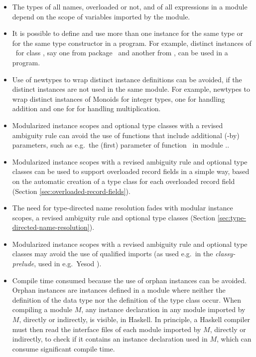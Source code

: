 \begin{itemize}

  \item The types of all names, overloaded or not, and of all
    expressions in a module depend on the scope of variables imported
    by the module.

  \item It is possible to define and use more than one instance for
    the same type or for the same type constructor in a program. For
    example, distinct instances of \Either\ for class \Monad, say one
    from package \mtl\ and another from \transformers, can be used in
    a program.

  \item Use of newtypes to wrap distinct instance definitions can be
    avoided, if the distinct instances are not used in the same
    module. For example, newtypes to wrap distinct instances of
    Monoids for integer types, one for handling addition and one for
    for handling multiplication.
    
  \item Modularized instance scopes and optional type classes with a
    revised ambiguity rule can avoid the use of functions that include
    additional (-by) parameters, such as e.g.~the (first) parameter of
    function \sortBy\ in module \Data.\List.

  \item Modularized instance scopes with a revised ambiguity rule and
    optional type classes can be used to support overloaded record
    fields in a simple way, based on the automatic creation of a type
    class for each overloaded record field (Section
    \ref{sec:overloaded-record-fields}).

  \item The need for type-directed name resolution fades with modular
    instance scopes, a revised ambiguity rule and optional type
    classes (Section \ref{sec:type-directed-name-resolution}).
    
  \item Modularized instance scopes with a revised ambiguity rule and
    optional type classes may avoid the use of qualified imports (as
    used e.g.~in the {\em classy-prelude}, used in e.g.~Yesod
    \cite{Yesod}).

  \item Compile time consumed because the use of orphan instances can
    be avoided.  Orphan instances are instances defined in a module
    where neither the definition of the data type nor the definition
    of the type class occur. When compiling a module $M$, any instance
    declaration in any module imported by $M$, directly or indirectly,
    is visible, in Haskell. In principle, a Haskell compiler must then
    read the interface files of each module imported by $M$, directly
    or indirectly, to check if it contains an instance declaration
    used in $M$, which can consume significant compile time.
    
\end{itemize}

